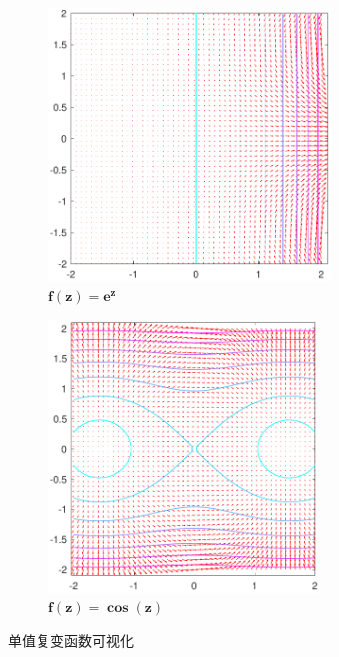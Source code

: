 \documentclass[UTF8]{report}
\theoremstyle{MyLineTheoremStyle} %
\theoremstyle{MyBlockTheoremStyle} %
\theoremstyle{MySubsubsectionStyle} %
\begin{document}
\begin{figure}[H]\centering
\begin{subfigure}[t]{0.49\textwidth}\centering
    \includegraphics[height=205pt]{assets/1,2/e^z.pdf}
    \caption{ $\boldsymbol{f(z) = e^z}$ }
\end{subfigure}\begin{subfigure}[t]{0.49\textwidth}\centering
    \includegraphics[height=205pt]{assets/1,2/cos z.pdf}
    \caption{ $\boldsymbol{f(z) = \cos (z)}$ }
\end{subfigure}
\caption{ 单值复变函数可视化 }\label{可视化3}
\end{figure}
\end{document}
